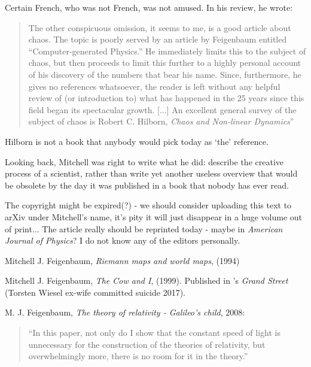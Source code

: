\begin{description}
Certain French, who was not French,
was not amused. In his review, he wrote:
\begin{quote}
  The other conspicuous omission, it seems to me, is a good
article about chaos. The topic is poorly served by an article
by Feigenbaum entitled ``Computer-generated Physics.'' He
immediately limits this to the subject of chaos, but then proceeds
to limit this further to a highly personal account of his
discovery of the numbers that bear his name. Since, furthermore,
he gives no references whatsoever, the reader is left
without any helpful review of (or introduction to) what has
happened in the 25 years since this field began its spectacular
growth.
[...]
An excellent general survey of the subject of chaos is Robert C.
Hilborn, {\em Chaos and Non-linear Dynamics}''
\end{quote}

Hilborn is not a book that anybody would pick today as `the' reference.

Looking back, Mitchell was right to write what he did: describe the
creative process of a scientist, rather than write yet another useless
overview that would be obsolete by the day it was published in a book
that nobody has ever read.

The copyright might be expired(?) - we should consider uploading this
text to arXiv under Mitchell's name, it's pity it will just disappear in
a huge volume out of print...
The article really should be reprinted today -
maybe in {\em American Journal of Physics}? I do not know any of the
{editors} personally.
\end{description}

{Mitchell J. Feigenbaum},
{\em Riemann maps and world maps},
(1994)

{Mitchell J. Feigenbaum},
{\em The Cow and I},
(1999).
Published in
's {\em Grand Street}
 (Torsten Wiesel ex-wife committed suicide 2017).

{M. J. Feigenbaum},
{\em The theory of relativity - {Galileo's} child},
{2008}:
\begin{quote}
``In this paper, not only do I show that the constant speed of light is
unnecessary for the construction of the theories of relativity, but
overwhelmingly more, there is no room for it in the theory.''
\end{quote}


